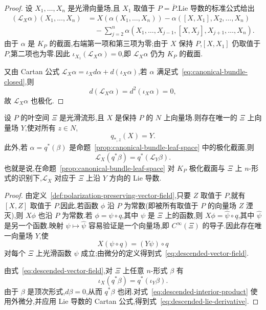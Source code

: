 {\begin{proof}
设 $X_1,\ldots,X_n$ 是光滑向量场,且 $X_1$ 取值于 $P=\overline P$.Lie 导数的标准公式给出
\[
\begin{aligned}
 (\mathcal L_X\alpha)(X_1,\ldots,X_n)
 &=X(\alpha(X_1,\ldots,X_n))
 -\alpha([X,X_1],X_2,\ldots,X_n)\\
 &\quad-\sum_{j=2}^n\alpha(X_1,\ldots,X_{j-1},[X,X_j],X_{j+1},\ldots,X_n).
 \label{eq:lie-derivative-canonical-form}
\end{aligned}
\]
由于 $\alpha$ 是 $K_P$ 的截面,右端第一项和第三项为零;由于 $X$ 保持 $P$,$[X,X_1]$ 仍取值于 $P$,第二项也为零.因此 $\iota_{X_1}(\mathcal L_X\alpha)=0$,即 $\mathcal L_X\alpha$ 仍为 $K_P$ 的截面.

又由 Cartan 公式 $\mathcal L_X\alpha=\iota_Xd\alpha+d(\iota_X\alpha)$,若 $\alpha$ 满足式~\eqref{eq:canonical-bundle-closed},则
\[
 d(\mathcal L_X\alpha)=d^2(\iota_X\alpha)=0,
\]
故 $\mathcal L_X\alpha$ 也极化.
\end{proof}

\begin{proposition}[叶空间上的下降向量场]
\label{prop:vector-field-descends-leaf-space}
设 $P$ 的叶空间 $\Xi$ 是光滑流形,且 $X$ 是保持 $P$ 的 $N$ 上向量场.则存在唯一的 $\Xi$ 上向量场 $Y$,使对所有 $z\in N$,
\[
 q_{*,z}(X)=Y.\label{eq:descended-vector-field}
\]
此外,若 $\alpha=q^*(\beta)$ 是命题~\ref{prop:canonical-bundle-leaf-space} 中的极化截面,则
\[
 \mathcal L_X(q^*\beta)=q^*(\mathcal L_Y\beta).
 \label{eq:descended-lie-derivative}
\]
也就是说,在命题~\ref{prop:canonical-bundle-leaf-space} 对 $K_P$ 极化截面与 $\Xi$ 上 $n$-形式的识别下,$\mathcal L_X$ 对应于 $\Xi$ 上沿 $Y$ 方向的 Lie 导数.
\end{proposition}

\begin{proof}
由定义~\ref{def:polarization-preserving-vector-field},只要 $Z$ 取值于 $P$,就有 $[X,Z]$ 取值于 $P$.因此,若函数 $\phi$ 沿 $P$ 为常数(即被所有取值于 $P$ 的向量场 $Z$ 湮灭),则 $X\phi$ 也沿 $P$ 为常数.若 $\phi=\psi\circ q$,其中 $\psi$ 是 $\Xi$ 上的函数,则 $X\phi=\widehat\psi\circ q$,其中 $\widehat\psi$ 是另一个函数.映射 $\psi\mapsto\widehat\psi$ 容易验证是一个向量场,即 $C^\infty(\Xi)$ 的导子.因此存在唯一向量场 $Y$,使
\[
 X(\psi\circ q)=(Y\psi)\circ q
 \label{eq:descended-vector-field-functions}
\]
对每个 $\Xi$ 上光滑函数 $\psi$ 成立;由微分的定义得到式~\eqref{eq:descended-vector-field}.

由式~\eqref{eq:descended-vector-field},对 $\Xi$ 上任意 $n$-形式 $\beta$ 有
\[
 \iota_X(q^*\beta)=q^*(\iota_Y\beta).
 \label{eq:descended-interior-product}
\]
由于 $\beta$ 是顶次形式,$d\beta=0$,从而 $q^*\beta$ 也闭.对式~\eqref{eq:descended-interior-product} 使用外微分,并应用 Lie 导数的 Cartan 公式,得到式~\eqref{eq:descended-lie-derivative}.
\end{proof}

}
